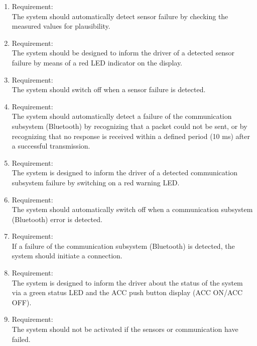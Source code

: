 \begin{enumerate}[label*=\arabic*.]
        \item \label{req.2} Requirement: \\
        The system should automatically detect sensor failure by checking the measured values for plausibility.  \\
	 	\item \label{req.3} Requirement: \\
        The system should be designed to inform the driver of a detected sensor failure by means of a red LED indicator on the display. \\
        \item \label{req.4} Requirement: \\
        The system should switch off when a sensor failure is detected. \\
        \item \label{req.5} Requirement: \\
        The system should automatically detect a failure of the communication subsystem (Bluetooth) by recognizing that a packet could not be sent, or by recognizing that no response is received within a defined period (10 ms) after a successful transmission. \\
        \item \label{req.6} Requirement: \\
        The system is designed to inform the driver of a detected communication subsystem failure by switching on a red warning LED. \\
        \item \label{req.7} Requirement: \\
        The system should automatically switch off when a communication subsystem (Bluetooth) error is detected. \\
        \item \label{req.8} Requirement: \\
        If a failure of the communication subsystem (Bluetooth) is detected, the system should initiate a connection. \\
        \item \label{req.9} Requirement: \\
        The system is designed to inform the driver about the status of the system via a green status LED and the ACC push button display (ACC ON/ACC OFF). \\
        \item \label{req.10} Requirement: \\
        The system should not be activated if the sensors or communication have failed. \\

\end{enumerate}
